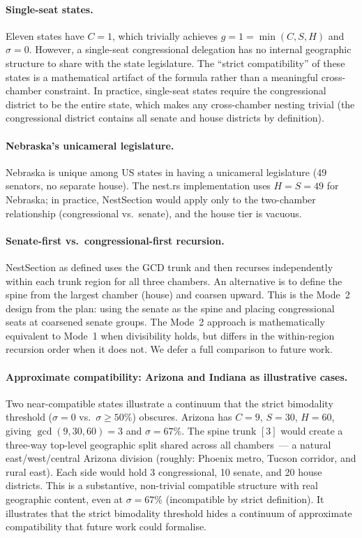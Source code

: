 \paragraph{Single-seat states.}
Eleven states have $C = 1$, which trivially achieves $g = 1 = \min(C,S,H)$
and $\sigma = 0$.  However, a single-seat congressional delegation has no
internal geographic structure to share with the state legislature.  The
``strict compatibility'' of these states is a mathematical artifact of the
formula rather than a meaningful cross-chamber constraint.  In practice,
single-seat states require the congressional district to be the entire state,
which makes any cross-chamber nesting trivial (the congressional district
contains all senate and house districts by definition).

\paragraph{Nebraska's unicameral legislature.}
Nebraska is unique among US states in having a unicameral legislature (49
senators, no separate house).  The nest.rs implementation uses $H = S = 49$
for Nebraska; in practice, NestSection would apply only to the two-chamber
relationship (congressional vs.\ senate), and the house tier is vacuous.

\paragraph{Senate-first vs.\ congressional-first recursion.}
NestSection as defined uses the GCD trunk and then recurses independently
within each trunk region for all three chambers.  An alternative is to define
the spine from the largest chamber (house) and coarsen upward.  This is the
Mode~2 design from the plan: using the senate as the spine and placing
congressional seats at coarsened senate groups.  The Mode~2 approach is
mathematically equivalent to Mode~1 when divisibility holds, but differs in
the within-region recursion order when it does not.  We defer a full
comparison to future work.

\paragraph{Approximate compatibility: Arizona and Indiana as illustrative cases.}
Two near-compatible states illustrate a continuum that the strict bimodality
threshold ($\sigma = 0$ vs.\ $\sigma \geq 50\%$) obscures.  Arizona has
$C = 9$, $S = 30$, $H = 60$, giving $\gcd(9, 30, 60) = 3$ and $\sigma = 67\%$.
The spine trunk $[3]$ would create a three-way top-level geographic split
shared across all chambers~--- a natural east/west/central Arizona division
(roughly: Phoenix metro, Tucson corridor, and rural east).  Each side would
hold 3 congressional, 10 senate, and 20 house districts.  This is a
substantive, non-trivial compatible structure with real geographic content,
even at $\sigma = 67\%$ (incompatible by strict definition).  It illustrates
that the strict bimodality threshold hides a continuum of approximate
compatibility that future work could formalise.

